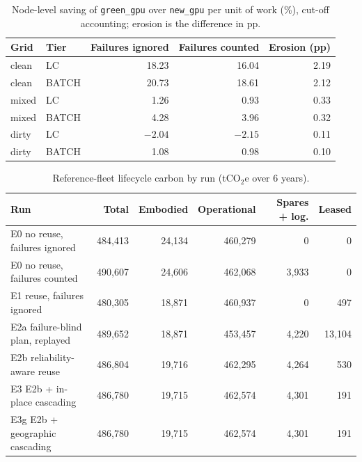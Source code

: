 \documentclass{article} %
\begin{document}
\begin{table}[h]
\caption{Node-level saving of \texttt{green\_gpu} over \texttt{new\_gpu} per unit of work (\%), cut-off accounting; erosion is the difference in pp.}
\label{tab:node_saving}
\begin{center}
\small
\begin{tabular}{llrrr}
\toprule
Grid & Tier & Failures ignored & Failures counted & Erosion (pp) \\
\midrule
clean & LC & 18.23 & 16.04 & 2.19 \\
clean & BATCH & 20.73 & 18.61 & 2.12 \\
mixed & LC & 1.26 & 0.93 & 0.33 \\
mixed & BATCH & 4.28 & 3.96 & 0.32 \\
dirty & LC & $-2.04$ & $-2.15$ & 0.11 \\
dirty & BATCH & 1.08 & 0.98 & 0.10 \\
\bottomrule
\end{tabular}
\end{center}
\end{table}

\begin{table}[h]
\caption{Reference-fleet lifecycle carbon by run (tCO$_2$e over 6 years).}
\label{tab:ladder}
\begin{center}
\small
\begin{tabular}{lrrrrr}
\toprule
Run & Total & Embodied & Operational & Spares + log. & Leased \\
\midrule
E0 no reuse, failures ignored & 484,413 & 24,134 & 460,279 & 0 & 0 \\
E0 no reuse, failures counted & 490,607 & 24,606 & 462,068 & 3,933 & 0 \\
E1 reuse, failures ignored & 480,305 & 18,871 & 460,937 & 0 & 497 \\
E2a failure-blind plan, replayed & 489,652 & 18,871 & 453,457 & 4,220 & 13,104 \\
E2b reliability-aware reuse & 486,804 & 19,716 & 462,295 & 4,264 & 530 \\
E3 E2b + in-place cascading & 486,780 & 19,715 & 462,574 & 4,301 & 191 \\
E3g E2b + geographic cascading & 486,780 & 19,715 & 462,574 & 4,301 & 191 \\
\bottomrule
\end{tabular}
\end{center}
\end{table}
\end{document}
